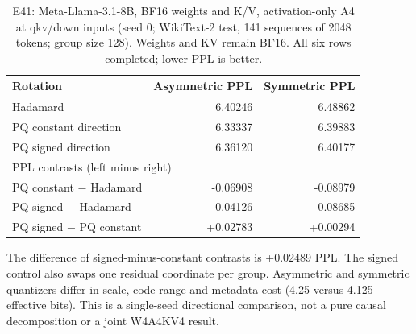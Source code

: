 \begin{table}[t]
\centering
\small
\caption{E41: Meta-Llama-3.1-8B, BF16 weights and K/V, activation-only A4 at qkv/down inputs (seed 0; WikiText-2 test, 141 sequences of 2048 tokens; group size 128). Weights and KV remain BF16. All six rows completed; lower PPL is better.}
\label{tab:e41-mechanism-seed0}
\begin{tabular}{lrr}
\toprule
Rotation & Asymmetric PPL & Symmetric PPL \\
\midrule
Hadamard & 6.40246 & 6.48862 \\
PQ constant direction & 6.33337 & 6.39883 \\
PQ signed direction & 6.36120 & 6.40177 \\
\midrule
\multicolumn{3}{l}{PPL contrasts (left minus right)} \\
PQ constant $-$ Hadamard & -0.06908 & -0.08979 \\
PQ signed $-$ Hadamard & -0.04126 & -0.08685 \\
PQ signed $-$ PQ constant & +0.02783 & +0.00294 \\
\bottomrule
\end{tabular}
\par\smallskip
\begin{minipage}{0.98\linewidth}
\footnotesize
The difference of signed-minus-constant contrasts is +0.02489 PPL. The signed control also swaps one residual coordinate per group. Asymmetric and symmetric quantizers differ in scale, code range and metadata cost (4.25 versus 4.125 effective bits). This is a single-seed directional comparison, not a pure causal decomposition or a joint W4A4KV4 result.
\end{minipage}
\end{table}
